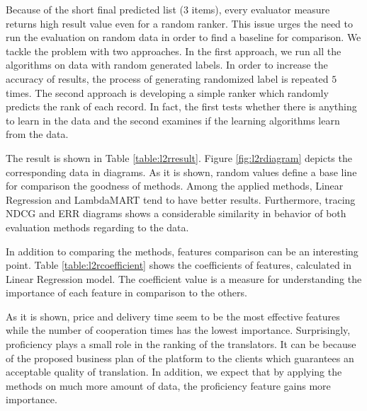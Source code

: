 Because of the short final predicted list ($3$ items), every evaluator measure returns high result value even for a random ranker. This issue urges the need to run the evaluation on random data in order to find a baseline for comparison. We tackle the problem with two approaches. In the first approach, we run all the algorithms on data with random generated labels. In order to increase the accuracy of results, the process of generating randomized label is repeated $5$ times. The second approach is developing a simple ranker which randomly predicts the rank of each record. In fact, the first tests whether there is anything to learn in the data and the second examines if the learning algorithms learn from the data.

The result is shown in Table \ref{table:l2rresult}.  Figure \ref{fig:l2rdiagram} depicts the corresponding data in diagrams. As it is shown, random values define a base line for comparison the goodness of methods. Among the applied methods, Linear Regression and LambdaMART tend to have better results. Furthermore, tracing NDCG and ERR diagrams shows a considerable similarity in behavior of both evaluation methods regarding to the data.

In addition to comparing the methods, features comparison can be an interesting point. Table \ref{table:l2rcoefficient} shows the coefficients of features, calculated in Linear Regression model. The coefficient value is a measure for understanding the importance of each feature in comparison to the others. 

As it is shown, price and delivery time seem to be the most effective features while the number of cooperation times has the lowest importance. Surprisingly, proficiency plays a small role in the ranking of the translators. It can be because of the proposed business plan of the platform to the clients which guarantees an acceptable quality of translation. In addition, we expect that by applying the methods on much more amount of data, the proficiency feature gains more importance.

